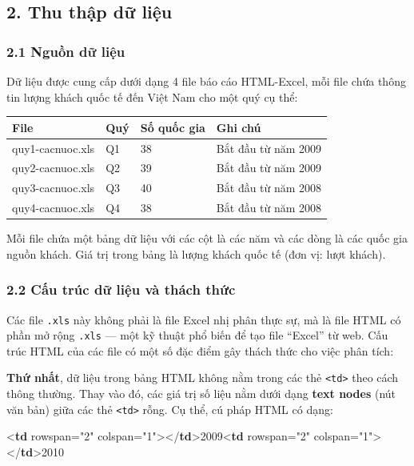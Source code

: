 \documentclass[11pt]{article}
\newenvironment{Shaded}{}{}
\newcommand{\KeywordTok}[1]{\textcolor[rgb]{0.00,0.44,0.13}{\textbf{{#1}}}}
\newcommand{\DataTypeTok}[1]{\textcolor[rgb]{0.56,0.13,0.00}{{#1}}}
\newcommand{\StringTok}[1]{\textcolor[rgb]{0.25,0.44,0.63}{{#1}}}
\newcommand{\OtherTok}[1]{\textcolor[rgb]{0.00,0.44,0.13}{{#1}}}
\newcommand{\NormalTok}[1]{{#1}}
\newcommand{\OperatorTok}[1]{\textcolor[rgb]{0.40,0.40,0.40}{{#1}}}
\begin{document}
    \subsection{2. Thu thập dữ liệu}\label{thu-thux1eadp-dux1eef-liux1ec7u}

\subsubsection{2.1 Nguồn dữ liệu}\label{nguux1ed3n-dux1eef-liux1ec7u}

Dữ liệu được cung cấp dưới dạng 4 file báo cáo HTML-Excel, mỗi file chứa
thông tin lượng khách quốc tế đến Việt Nam cho một quý cụ thể:

\begin{longtable}[]{@{}llll@{}}
\toprule\noalign{}
File & Quý & Số quốc gia & Ghi chú \\
\midrule\noalign{}
\endhead
\bottomrule\noalign{}
\endlastfoot
quy1-cacnuoc.xls & Q1 & 38 & Bắt đầu từ năm 2009 \\
quy2-cacnuoc.xls & Q2 & 39 & Bắt đầu từ năm 2009 \\
quy3-cacnuoc.xls & Q3 & 40 & Bắt đầu từ năm 2008 \\
quy4-cacnuoc.xls & Q4 & 38 & Bắt đầu từ năm 2008 \\
\end{longtable}

Mỗi file chứa một bảng dữ liệu với các cột là các năm và các dòng là các
quốc gia nguồn khách. Giá trị trong bảng là lượng khách quốc tế (đơn vị:
lượt khách).

\subsubsection{2.2 Cấu trúc dữ liệu và thách
thức}\label{cux1ea5u-truxfac-dux1eef-liux1ec7u-vuxe0-thuxe1ch-thux1ee9c}

Các file \texttt{.xls} này không phải là file Excel nhị phân thực sự, mà
là file HTML có phần mở rộng \texttt{.xls} --- một kỹ thuật phổ biến để
tạo file ``Excel'' từ web. Cấu trúc HTML của các file có một số đặc điểm
gây thách thức cho việc phân tích:

\textbf{Thứ nhất}, dữ liệu trong bảng HTML không nằm trong các thẻ
\texttt{\textless{}td\textgreater{}} theo cách thông thường. Thay vào
đó, các giá trị số liệu nằm dưới dạng \textbf{text nodes} (nút văn bản)
giữa các thẻ \texttt{\textless{}td\textgreater{}} rỗng. Cụ thể, cú pháp
HTML có dạng:

\begin{Shaded}
\begin{Highlighting}[]
\DataTypeTok{\textless{}}\KeywordTok{td}\OtherTok{ rowspan}\OperatorTok{=}\StringTok{"2"}\OtherTok{ colspan}\OperatorTok{=}\StringTok{"1"}\DataTypeTok{\textgreater{}\textless{}/}\KeywordTok{td}\DataTypeTok{\textgreater{}}\NormalTok{2009}\DataTypeTok{\textless{}}\KeywordTok{td}\OtherTok{ rowspan}\OperatorTok{=}\StringTok{"2"}\OtherTok{ colspan}\OperatorTok{=}\StringTok{"1"}\DataTypeTok{\textgreater{}\textless{}/}\KeywordTok{td}\DataTypeTok{\textgreater{}}\NormalTok{2010}
\end{Highlighting}
\end{Shaded}
\end{document}
